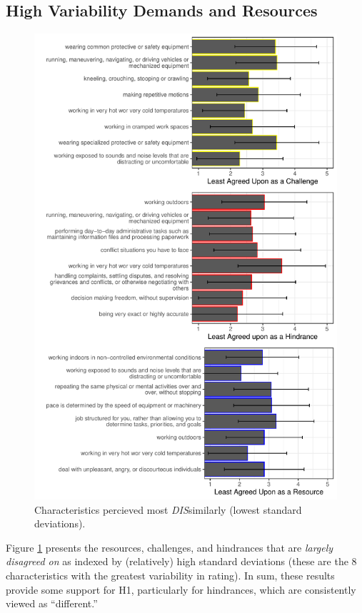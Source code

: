\documentclass[
  english,
  man]{apa6}
\begin{document}
\hypertarget{high-variability-demands-and-resources}{%
\subsection{High Variability Demands and Resources}\label{high-variability-demands-and-resources}}

\begin{figure}
\centering
\includegraphics{Submission_files/figure-latex/combinegraphs2-1.pdf}
\caption{\label{fig:combinegraphs2}Characteristics percieved most \emph{DIS}similarly (lowest standard deviations).}
\end{figure}

Figure \ref{fig:combinegraphs2} presents the resources, challenges, and hindrances that are \emph{largely disagreed on} as indexed by (relatively) high standard deviations (these are the 8 characteristics with the greatest variability in rating). In sum, these results provide some support for H1, particularly for hindrances, which are consistently viewed as ``different.''
\end{document}
